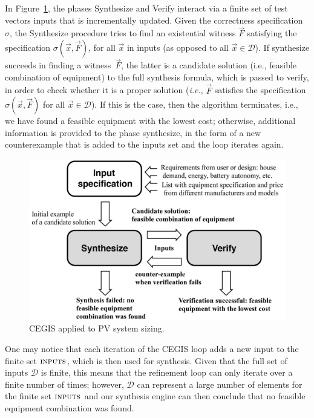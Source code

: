 \documentclass[10pt,conference]{IEEEtran}
\begin{document}
In Figure~\ref{Counter-Example-Guided-Inductive-Synthesis}, the phases {\sc Synthesize} and {\sc Verify} interact via a finite set of test vectors {\sc inputs} that is incrementally updated. Given the correctness specification $\sigma$, the {\sc Synthesize} procedure tries to find an existential witness $\vec{F}$ satisfying the specification $\sigma(\vec{x}, \vec{F})$, for all $\vec{x}$ in {\sc inputs} (as opposed to all $\vec{x} \in \mathcal{D}$). If {\sc synthesize} succeeds in finding a witness~$\vec{F}$, the latter is a candidate solution (i.e., feasible combination of equipment) to the full synthesis formula, which is passed to {\sc verify}, in order to check whether it is a proper solution ({\it i.e.}, $\vec{F}$ satisfies the specification $\sigma(\vec{x}, \vec{F})$ for all $\vec{x}\in\mathcal{D}$). If this is the case, then the algorithm terminates, i.e., we have found a feasible equipment with the lowest cost; otherwise, additional information is provided to the phase {\sc synthesize}, in the form of a new counterexample that is added to the {\sc inputs} set and the loop iterates again. 
%
\begin{figure}[h]
	\centering
	\includegraphics[width=0.85\columnwidth]{fig2_rev.jpg}
	\caption{CEGIS applied to PV system sizing.}
	\label{Counter-Example-Guided-Inductive-Synthesis}
\end{figure}
%
One may notice that each iteration of the CEGIS loop adds a new input to the finite set $\text{\sc inputs}$, which is then used for synthesis.  Given that the full set of inputs $\mathcal{D}$ is finite, this means that the refinement loop can only iterate over a finite number of times; however, $\mathcal{D}$ can represent a large number of elements for the finite set $\text{\sc inputs}$ and our synthesis engine can then conclude that no feasible equipment combination was found. 
\end{document}

